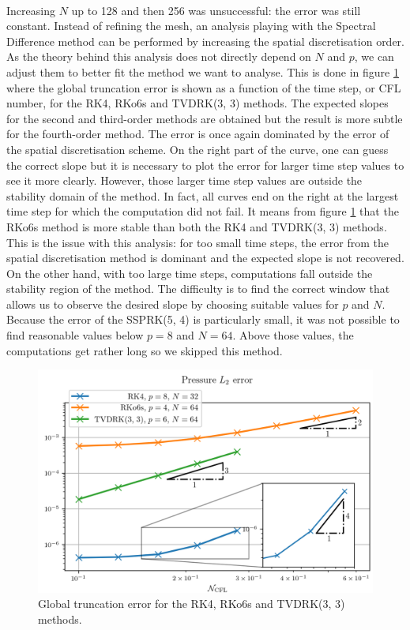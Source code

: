       \paragraph{}
      Increasing $N$ up to 128 and then 256 was unsuccessful: the error was still constant.
      Instead of refining the mesh, an analysis playing with the Spectral Difference method can be performed by increasing the spatial discretisation order.
      As the theory behind this analysis does not directly depend on $N$ and $p$, we can adjust them to better fit the method we want to analyse.
      This is done in figure \ref{fig:covo_rk} where the global truncation error is shown as a function of the time step, or CFL number, for the RK4, RKo6s and TVDRK(3, 3) methods.
      The expected slopes for the second and third-order methods are obtained but the result is more subtle for the fourth-order method.
      The error is once again dominated by the error of the spatial discretisation scheme.
      On the right part of the curve, one can guess the correct slope but it is necessary to plot the error for larger time step values
      to see it more clearly.
      However, those larger time step values are outside the stability domain of the method.
      In fact, all curves end on the right at the largest time step for which the computation did not fail.
      It means from figure \ref{fig:covo_rk} that the RKo6s method is more stable than both the RK4 and TVDRK(3, 3) methods.
      This is the issue with this analysis: for too small time steps, the error from the spatial discretisation method is dominant and the expected slope is not recovered.
      On the other hand, with too large time steps, computations fall outside the stability region of the method.
      The difficulty is to find the correct window that allows us to observe the desired slope by choosing suitable values for $p$ and $N$.
      Because the error of the SSPRK(5, 4) is particularly small, it was not possible to find reasonable values below $p = 8$ and $N = 64$.
      Above those values, the computations get rather long so we skipped this method.

      \begin{figure}
        \centering
        \includegraphics{figures/covo_rk.png}
        \caption{Global truncation error for the RK4, RKo6s and TVDRK(3, 3) methods.}
        \label{fig:covo_rk}
      \end{figure}

